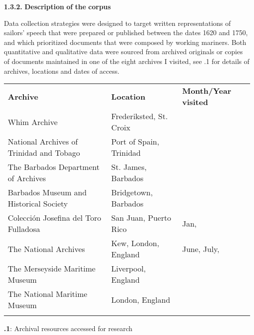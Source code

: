 \begin{styleNormali}
  \textbf{1.3.2.} \textbf{Description} \textbf{of} \textbf{the} \textbf{corpus}
\end{styleNormali}

\begin{styleNormali}
Data collection strategies were designed to target written representations of sailors’ speech that were prepared or published between the dates 1620 and 1750, and which prioritized documents that were composed by working mariners. Both quantitative and qualitative data were sourced from archived originals or copies of documents maintained in one of the eight archives I visited, see .1 for details of archives, locations and dates of access.
\end{styleNormali}

\tablefirsthead{}

\tabletail{}
\tablelasttail{}
\begin{tabularx}{\textwidth}{XXX}

\lsptoprule

\textbf{Archive} & \textbf{Location} & \textbf{Month/Year} \textbf{visited}\\
Whim Archive & Frederiksted, St. Croix & \citealt{May2010}\\
National Archives of Trinidad and Tobago & Port of Spain, Trinidad & \citealt{July2012}\\
The Barbados Department of Archives & St. James, Barbados & \citealt{July2013}\\
Barbados Museum and Historical Society & Bridgetown, Barbados & \citealt{July2013}\\
Colección Josefina del Toro Fulladosa & San Juan, Puerto Rico & Jan, \citealt{Feb2014}\\
The National Archives & Kew, London, England & June, July, \citealt{Nov2015}\\
The Merseyside Maritime Museum & Liverpool, England & \citealt{July2015}\\
The National Maritime Museum & London, England & \citealt{November2015}\\
\lspbottomrule
\end{tabularx}
\begin{styleNormali}
\textbf{.1}: Archival resources accessed for research
\end{styleNormali}

